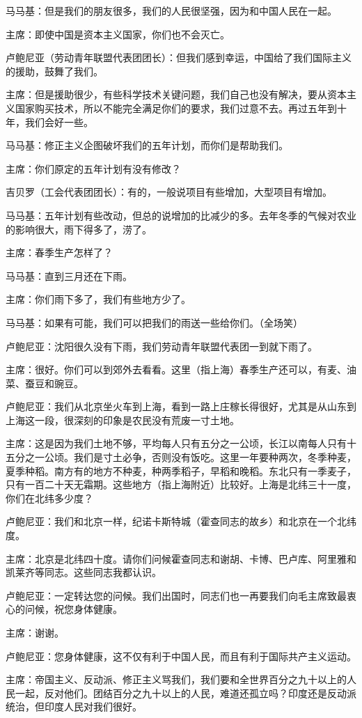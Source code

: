马马基：但是我们的朋友很多，我们的人民很坚强，因为和中国人民在一起。

主席：即使中国是资本主义国家，你们也不会灭亡。

卢鲍尼亚（劳动青年联盟代表团团长）：但我们感到幸运，中国给了我们国际主义的援助，鼓舞了我们。

主席：但是援助很少，有些科学技术关键问题，我们自己也没有解决，要从资本主义国家购买技术，所以不能完全满足你们的要求，我们过意不去。再过五年到十年，我们会好一些。

马马基：修正主义企图破坏我们的五年计划，而你们是帮助我们。

主席：你们原定的五年计划有没有修改？

吉贝罗（工会代表团团长）：有的，一般说项目有些增加，大型项目有增加。

马马基：五年计划有些改动，但总的说增加的比减少的多。去年冬季的气候对农业的影响很大，雨下得多了，涝了。

主席：春季生产怎样了？

马马基：直到三月还在下雨。

主席：你们雨下多了，我们有些地方少了。

马马基：如果有可能，我们可以把我们的雨送一些给你们。（全场笑）

卢鲍尼亚：沈阳很久没有下雨，我们劳动青年联盟代表团一到就下雨了。

主席：很好。你们可以到郊外去看看。这里（指上海）春季生产还可以，有麦、油菜、蚕豆和豌豆。

卢鲍尼亚：我们从北京坐火车到上海，看到一路上庄稼长得很好，尤其是从山东到上海这一段，很深刻的印象是农民没有荒废一寸土地。

主席：这是因为我们土地不够，平均每人只有五分之一公顷，长江以南每人只有十五分之一公顷。我们是寸土必争，否则没有饭吃。这里一年要种两次，冬季种麦，夏季种稻。南方有的地方不种麦，种两季稻子，早稻和晚稻。东北只有一季麦子，只有一百二十天无霜期。这些地方（指上海附近）比较好。上海是北纬三十一度，你们在北纬多少度？

卢鲍尼亚：我们和北京一样，纪诺卡斯特城（霍查同志的故乡）和北京在一个北纬度。

主席：北京是北纬四十度。请你们问候霍查同志和谢胡、卡博、巴卢库、阿里雅和凯莱齐等同志。这些同志我都认识。

卢鲍尼亚：一定转达您的问候。我们出国时，同志们也一再要我们向毛主席致最衷心的问候，祝您身体健康。

主席：谢谢。

卢鲍尼亚：您身体健康，这不仅有利于中国人民，而且有利于国际共产主义运动。

主席：帝国主义、反动派、修正主义骂我们，我们要和全世界百分之九十以上的人民一起，反对他们。团结百分之九十以上的人民，难道还孤立吗？印度还是反动派统治，但印度人民对我们很好。

